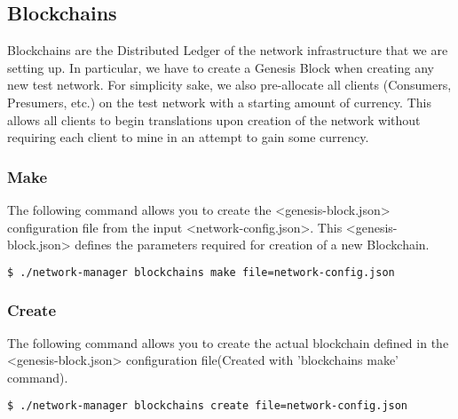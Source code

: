\subsection{Blockchains}

Blockchains are the Distributed Ledger of the network infrastructure that we are setting up. In particular, we have to create a Genesis Block when creating any new test network. For simplicity sake, we also pre-allocate all clients (Consumers, Presumers, etc.) on the test network with a starting amount of currency. This allows all clients to begin translations upon creation of the network without requiring each client to mine in an attempt to gain some currency. 

\subsubsection{Make}

The following command allows you to create the <genesis-block.json> configuration file from the input <network-config.json>. This <genesis-block.json> defines the parameters required for creation of a new Blockchain.
\begin{lstlisting}[language=bash]
$ ./network-manager blockchains make file=network-config.json
\end{lstlisting}

\subsubsection{Create}
The following command allows you to create the actual blockchain defined in the <genesis-block.json> configuration file(Created with 'blockchains make' command).
\begin{lstlisting}[language=bash]
$ ./network-manager blockchains create file=network-config.json
\end{lstlisting}